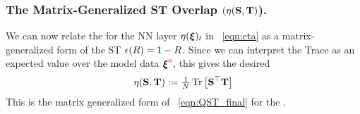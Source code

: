 \subsubsection{The Matrix-Generalized ST Overlap 
\texorpdfstring{$(\eta({\mathbf{S}},{\mathbf{T}})$)}{ETA(S, T)}.}
We can now relate the \SelfOverlap for the NN layer $\eta(\boldsymbol{\xi})_{l}$ in \EQN~\ref{eqn:eta}
as a matrix-generalized form of the ST \EffectivePotential $\epsilon(R)=1-R$.
Since we can interpret the Trace as an expected value over the model data $\boldsymbol{\xi}^{{\color{red}\sf{n}}}$, this gives the desired
\begin{align}
  \label{eqn:eta_mat_avg_def}
  \eta({\mathbf{S}},{\mathbf{T}})
  :=\tfrac{1}{N} \mbox{}\operatorname{Tr}\left[{\mathbf{S}}^{\top}{\mathbf{T}}\right] 
\end{align}
This is the matrix generalized form of \EQN~\ref{eqn:QST_final} for the \LayerQuality.

